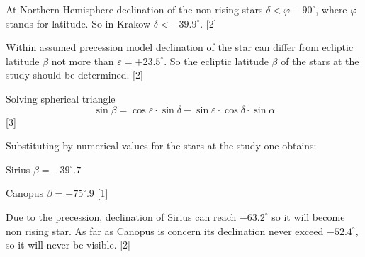 At Northern Hemisphere declination of the non-rising stars
$\delta < \varphi - 90^\circ$, where $\varphi$ stands for latitude. So in
Krakow $\delta < -39.9^\circ$. \hfill[2]

Within assumed precession model declination of the star can differ from
ecliptic latitude $\beta$ not more than $\varepsilon = +23.5^\circ$. So the
ecliptic latitude $\beta$ of the stars at the study should be determined.
\hfill[2]

Solving spherical triangle
\[
  \sin\beta = \cos\varepsilon\cdot\sin\delta
    - \sin\varepsilon\cdot\cos\delta\cdot\sin\alpha
\]
\hfill[3]

Substituting by numerical values for the stars at the study one obtains:

Sirius $\beta = -39^\circ\!.7$

Canopus $\beta = -75^\circ\!.9$ \hfill[1]

Due to the precession, declination of Sirius can reach $-63.2^\circ$ so it
will become non rising star. As far as Canopus is concern its declination
never exceed $-52.4^\circ$, so it will never be visible. \hfill[2]
